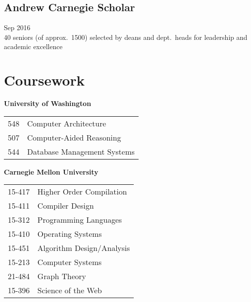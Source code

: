\documentclass{article}
\begin{document}
\subsection{Andrew Carnegie Scholar}
\hfill Sep 2016 \\
40 seniors (of approx.~1500) selected by deans and dept.\ heads for leadership and academic excellence

\section{Coursework}


\begin{minipage}[t]{0.45\linewidth}
  \raggedright
  \textbf{University of Washington}
  \begin{tabular}{ll}
    548 & Computer Architecture \\
    507 & Computer-Aided Reasoning \\
    544 & Database Management Systems \\
  \end{tabular}
\end{minipage}
\hfill
\begin{minipage}[t]{0.45\linewidth}
  \raggedright
  \textbf{Carnegie Mellon University}
  \begin{tabular}{ll}
    15-417 & Higher Order Compilation  \\
    15-411 & Compiler Design                 \\
    15-312 & Programming Languages           \\
    15-410 & Operating Systems               \\
    15-451 & Algorithm Design/Analysis   \\
    15-213 & Computer Systems                \\
    21-484 & Graph Theory                    \\
    15-396 & Science of the Web              \\
  \end{tabular}
\end{minipage}
\end{document}
